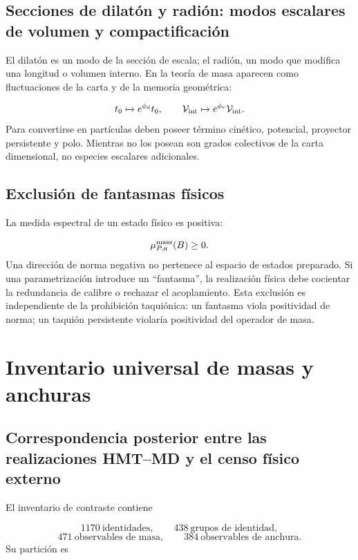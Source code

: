 \subsection{Secciones de dilatón y radión: modos escalares de volumen y compactificación}
El dilatón es un modo de la sección de escala; el radión, un modo que modifica una longitud o volumen interno. En la teoría de masa aparecen como fluctuaciones de la carta y de la memoria geométrica:

\[
 t_0\mapsto e^{\phi_d}t_0,\qquad
 \mathcal V_{\rm int}\mapsto e^{\phi_r}\mathcal V_{\rm int}.
\]
Para convertirse en partículas deben poseer término cinético, potencial, proyector persistente y polo. Mientras no los posean son grados colectivos de la carta dimensional, no especies escalares adicionales.

\subsection{Exclusión de fantasmas físicos}
La medida espectral de un estado físico es positiva:

\[
 \mu_{P,a}^{\rm mass}(B)\ge0.
\]
Una dirección de norma negativa no pertenece al espacio de estados preparado. Si una parametrización introduce un “fantasma”, la realización física debe cocientar la redundancia de calibre o rechazar el acoplamiento. Esta exclusión es independiente de la prohibición taquiónica: un fantasma viola positividad de norma; un taquión persistente violaría positividad del operador de masa.

\section{Inventario universal de masas y anchuras}
\subsection{Correspondencia posterior entre las realizaciones HMT–MD y el censo físico externo}
El inventario de contraste contiene

\[
 1170\ \text{identidades},\qquad
 438\ \text{grupos de identidad},
\]
\[
 471\ \text{observables de masa},\qquad
 384\ \text{observables de anchura}.
\]
Su partición es

